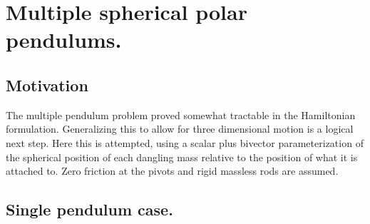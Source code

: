 

\chapter{Multiple spherical polar pendulums.}
\label{chap:sPolarMultiPendulum}
{}
\date{Oct 27, 2009}

\beginArtWithToc

\section{Motivation}

The multiple pendulum problem proved somewhat tractable in the Hamiltonian formulation.  Generalizing this to allow for three dimensional motion is a logical next step.  Here this is attempted, using a scalar plus bivector parameterization of the spherical position of each dangling mass relative to the position of what it is attached to.  Zero friction at the pivots and rigid massless rods are assumed.

\section{Single pendulum case.}



\EndNoBibArticle
